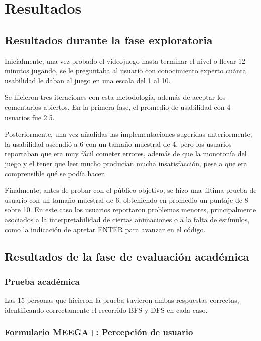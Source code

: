 \chapter{Resultados}

\section{Resultados durante la fase exploratoria}

Inicialmente, una vez probado el videojuego hasta terminar el nivel o llevar 12 minutos jugando, se le preguntaba al usuario con conocimiento experto cuánta usabilidad le daban al juego en una escala del 1 al 10.

Se hicieron tres iteraciones con esta metodología, además de aceptar los comentarios abiertos. En la primera fase, el promedio de usabilidad con 4 usuarios fue 2.5.

Posteriormente, una vez añadidas las implementaciones sugeridas anteriormente, la usabilidad ascendió a 6 con un tamaño muestral de 4, pero los usuarios reportaban que era muy fácil cometer errores, además de que la monotonía del juego y el tener que leer mucho producían mucha insatisfacción, pese a que era comprensible qué se podía hacer.

Finalmente, antes de probar con el público objetivo, se hizo una última prueba de usuario con un tamaño muestral de 6, obteniendo en promedio un puntaje de 8 sobre 10. En este caso los usuarios reportaron problemas menores, principalmente asociados a la interpretabilidad de ciertas animaciones o a la falta de estímulos, como la indicación de apretar ENTER para avanzar en el código.

\section{Resultados de la fase de evaluación académica}

\subsection{Prueba académica}

Las 15 personas que hicieron la prueba tuvieron ambas respuestas correctas, identificando correctamente el recorrido BFS y DFS en cada caso.

\subsection{Formulario MEEGA+: Percepción de usuario}

